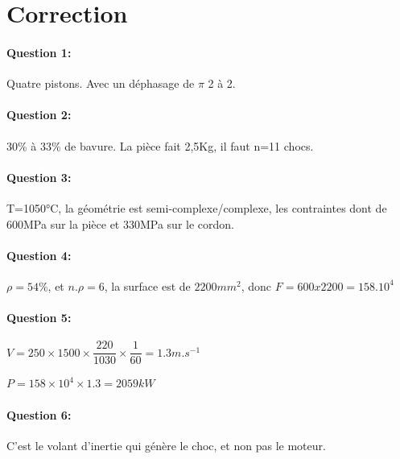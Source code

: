 \pagestyle{correction}

\section{Correction}

\paragraph{Question 1:} Quatre pistons. Avec un déphasage de $\pi$ 2 à 2.

\paragraph{Question 2:} 30\% à 33\% de bavure. La pièce fait 2,5Kg, il faut n=11 chocs.

\paragraph{Question 3:} T=1050°C, la géométrie est semi-complexe/complexe, les contraintes dont de 600MPa sur la pièce et 330MPa sur le cordon.

\paragraph{Question 4:} $\rho=54\%$, et $n.\rho=6$, la surface est de $2200mm^2$, donc $F=600x2200=158.10^4$
  
\paragraph{Question 5:} $V=250\times 1500\times \dfrac{220}{1030}\times \dfrac{1}{60}=1.3m.s^{-1}$

$P=158\times 10^4\times 1.3=2059kW$

\paragraph{Question 6:} C'est le volant d'inertie qui génère le choc, et non pas le moteur.


